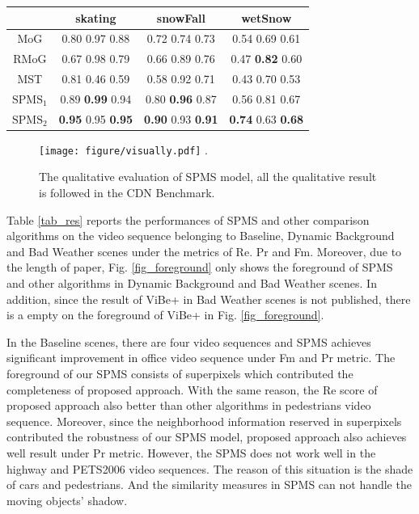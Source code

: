 \documentclass[runningheads,a4paper]{llncs}
\newcommand{\reffig}[1]{Fig. \ref{#1}}
\newcommand{\reftab}[1]{Table \ref{#1}}
\begin{document}
\begin{table}[!t]
\begin{tabular*}{0.718\textwidth}{@{\extracolsep{\fill}}cccc}
\cline{2-4}
& skating & snowFall & wetSnow \\
\hline
MoG \cite{2004_ICPR_iMoG}       & 0.80 0.97 0.88 & 0.72 0.74 0.73 & 0.54 0.69 0.61 \\
RMoG \cite{2013_ICAVSBS_RMoG}   & 0.67 0.98 0.79 & 0.66 0.89 0.76 & 0.47 \textbf{0.82} 0.60 \\
MST \cite{2014_ICIP_MST}        & 0.81 0.46 0.59 & 0.58 0.92 0.71 & 0.43 0.70 0.53 \\
\hline
$\text{SPMS}_1$                 & 0.89 \textbf{0.99} 0.94 & 0.80 \textbf{0.96} 0.87 & 0.56 0.81 0.67 \\
$\text{SPMS}_2$                 & \textbf{0.95} 0.95 \textbf{0.95} & \textbf{0.90} 0.93 \textbf{0.91} & \textbf{0.74} 0.63 \textbf{0.68} \\
\hline
\end{tabular*}
\end{table}
\begin{figure}[!t]	%
\label{fig_foreground}
\centering
\texttt{[image: figure/visually.pdf]}
\DeclareGraphicsExtensions.
\vspace{-10pt}
\caption{The qualitative evaluation of SPMS model, all the qualitative
result is followed in the CDN \cite{2014_CVPR_CDnet_Wang} Benchmark.}
\label{fig3}		%
\end{figure}

\reftab{tab_res} reports the performances of SPMS and other comparison
algorithms on the video sequence belonging to Baseline, Dynamic
Background and Bad Weather scenes under the metrics of Re. Pr and Fm.
Moreover, due to the length of paper, \reffig{fig_foreground} only shows the
foreground of SPMS and other algorithms in Dynamic Background and Bad Weather
scenes.
In addition, since the result of ViBe+ \cite{2011_TIP_ViBep} in Bad Weather scenes is
not published, there is a empty on the
foreground of ViBe+ in \reffig{fig_foreground}.

In the Baseline scenes, there are four video sequences and SPMS achieves
significant improvement in office video sequence under Fm and Pr metric.
The foreground of our SPMS consists of superpixels which contributed
the completeness of proposed approach.
With the same reason, the Re score of proposed approach also better than other
algorithms in pedestrians video sequence.
Moreover, since the neighborhood information reserved in superpixels contributed
the robustness of our SPMS model, proposed approach also achieves well
result under Pr metric.
However, the SPMS does not work well in the highway and PETS2006 video
sequences. 
The reason of this situation is the shade of cars and
pedestrians. And the similarity measures in SPMS can not handle the
moving objects' shadow.
\end{document}
